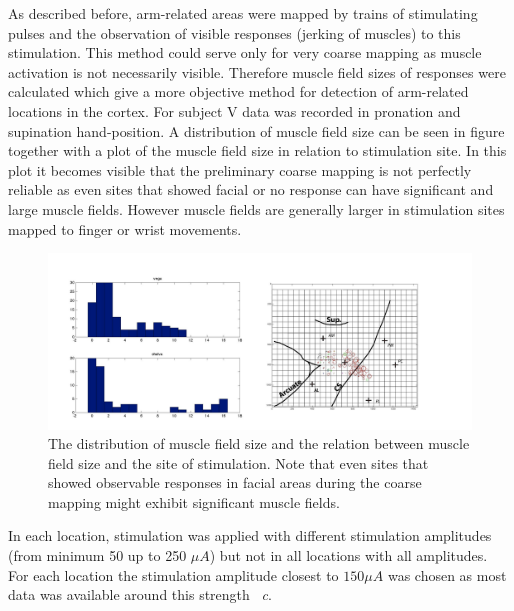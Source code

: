 As described before, arm-related areas were mapped by trains of stimulating pulses and the observation of visible responses (jerking of muscles) to this stimulation. This method could serve only for very coarse mapping as muscle activation is not necessarily visible. Therefore muscle field sizes of responses were calculated which give a more objective method for detection of arm-related locations in the cortex. For subject V data was recorded in pronation and supination hand-position.
A distribution of muscle field size can be seen in figure~ together with a plot of the muscle field size in relation to stimulation site. In this plot it becomes visible that the preliminary coarse mapping is not perfectly reliable as even sites that showed facial or no response can have significant and large muscle fields. However muscle fields are generally larger in stimulation sites mapped to finger or wrist movements. 
\begin{figure}[ht]
    \centering
        \includegraphics[width=\textwidth]{images/responses.jpg}
    \caption{The distribution of muscle field size and the relation between muscle field size and the site of stimulation. Note that even sites that showed observable responses in facial areas during the coarse mapping might exhibit significant muscle fields.}
    \label{sg:fig:images_responses}
\end{figure}

In each location, stimulation was applied with different stimulation amplitudes (from minimum 50 up to 250 $\mu A$) but not in all locations with all amplitudes. For each location the stimulation amplitude closest to $150 \mu A$ was chosen as most data was available around this strength~ \emph{c}.

